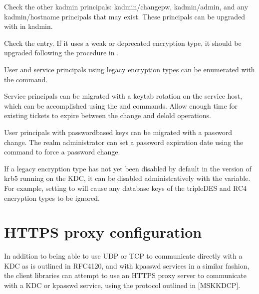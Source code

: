 \documentclass[letterpaper,10pt,english]{sphinxmanual}
\begin{document}
\sphinxAtStartPar
Check the other kadmin principals: kadmin/changepw, kadmin/admin, and
any kadmin/hostname principals that may exist.  These principals can
be upgraded with  in kadmin.

\sphinxAtStartPar
Check the  entry.  If it uses a weak or deprecated encryption
type, it should be upgraded following the procedure in
{\hyperref[\detokenize{admin/database:updating-master-key}]{}}.

\sphinxAtStartPar
User and service principals using legacy encryption types can be
enumerated with the {\hyperref[\detokenize{admin/admin_commands/kdb5_util:kdb5-util-8}]{}}  command.

\sphinxAtStartPar
Service principals can be migrated with a keytab rotation on the
service host, which can be accomplished using the {\hyperref[\detokenize{admin/admin_commands/k5srvutil:k5srvutil-1}]{}}
 and  commands.  Allow enough time for existing
tickets to expire between the change and delold operations.

\sphinxAtStartPar
User principals with password\sphinxhyphen{}based keys can be migrated with a
password change.  The realm administrator can set a password
expiration date using the {\hyperref[\detokenize{admin/admin_commands/kadmin_local:kadmin-1}]{}}  command to force a password change.

\sphinxAtStartPar
If a legacy encryption type has not yet been disabled by default in
the version of krb5 running on the KDC, it can be disabled
administratively with the  variable.  For
example, setting  to  will
cause any database keys of the triple\sphinxhyphen{}DES and RC4 encryption types to
be ignored.


\chapter{HTTPS proxy configuration}
\label{\detokenize{admin/https:https-proxy-configuration}}\label{\detokenize{admin/https:https}}\label{\detokenize{admin/https::doc}}
\sphinxAtStartPar
In addition to being able to use UDP or TCP to communicate directly
with a KDC as is outlined in RFC4120, and with kpasswd services in a
similar fashion, the client libraries can attempt to use an HTTPS
proxy server to communicate with a KDC or kpasswd service, using the
protocol outlined in {[}MS\sphinxhyphen{}KKDCP{]}.
\end{document}
